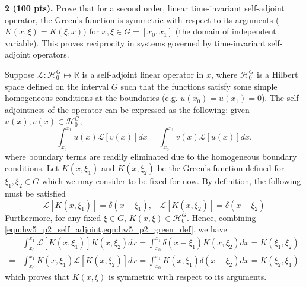\begin{problem}
    \textbf{2 (100 pts).} 
    Prove that for a second order, linear time-invariant self-adjoint operator, the Green's function is symmetric with respect to its arguments ($K(x, \xi) = K(\xi, x)$) for $x, \xi \in G = [x_0, x_1]$ (the domain of independent variable). This proves reciprocity in systems governed by time-invariant self-adjoint operators.
\end{problem}
Suppose $\mathcal{L}: \mathcal{H}_0^{G} \mapsto \mathbb{R}$ is a self-adjoint linear operator in $x$, where $\mathcal{H}_0^{G}$ is a Hilbert space defined on the interval $G$ such that the functions satisfy some simple homogeneous conditions at the boundaries (e.g. $u(x_0) = u(x_1) = 0$). 
The self-adjointness of the operator can be expressed as the following: given $u(x), v(x) \in \mathcal{H}_0^G$,  
\begin{equation}\label{eqn:hw5_p2_self_adjoint}
    \int_{x_0}^{x_1} u(x) \mathcal{L}[v(x)] dx = \int_{x_0}^{x_1} v(x) \mathcal{L}[u(x)] dx.
\end{equation}
where boundary terms are readily eliminated due to the homogeneous boundary conditions. 
Let $K(x, \xi_1)$ and $K(x, \xi_2)$ be the Green's function defined for $\xi_1, \xi_2 \in G$ which we may consider to be fixed for now. 
By definition, the following must be satisfied 
\begin{equation}\label{eqn:hw5_p2_green_def}
    \mathcal{L}[K(x, \xi_1)] = \delta(x - \xi_1), ~~~~ \mathcal{L}[K(x, \xi_2)] = \delta(x - \xi_2)
\end{equation}
Furthermore, for any fixed $\xi \in G$, $K(x, \xi) \in \mathcal{H}_0^G$. 
Hence, combining \cref{eqn:hw5_p2_self_adjoint,eqn:hw5_p2_green_def}, we have 
\begin{equation}
\begin{aligned}
    & \int_{x_0}^{x_1} \mathcal{L}[K(x, \xi_1)] K(x, \xi_2) dx = \int_{x_0}^{x_1} \delta(x - \xi_1) K(x, \xi_2) dx = K(\xi_1, \xi_2) \\
    = & \int_{x_0}^{x_1} K(x, \xi_1) \mathcal{L}[K(x, \xi_2)] dx = \int_{x_0}^{x_1} K(x, \xi_1) \delta(x - \xi_2) dx = K(\xi_2, \xi_1)
\end{aligned}
\end{equation}
which proves that $K(x, \xi)$ is symmetric with respect to its arguments. 

